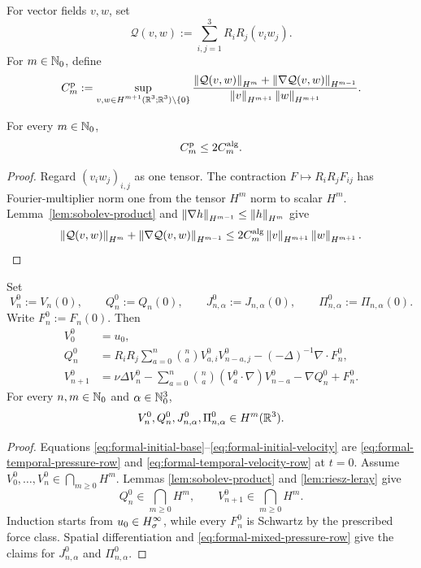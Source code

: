 \begin{definition}
\label{def:formal-canonical-bilinear-constants}
For vector fields \(v,w\), set
\[
 \mathcal Q(v,w):=\sum_{i,j=1}^3R_iR_j(v_i w_j).
\]
For \(m\in\mathbb N_0\), define
\[
 C_m^{\rm p}:=
 \sup_{\substack{
 v,w\in H^{m+1}(\mathbb R^3;\mathbb R^3)\setminus\{0\}}}
 \frac{
 \left\lVert \mathcal Q(v,w)\right\rVert_{H^m}
 +\left\lVert \nabla\mathcal Q(v,w)\right\rVert_{H^{m-1}}}
 {\left\lVert v\right\rVert_{H^{m+1}}\left\lVert w\right\rVert_{H^{m+1}}}.
\]
\end{definition}

\begin{lemma}
\label{lem:formal-canonical-bilinear-constants}
For every \(m\in\mathbb N_0\),
\[
 C_m^{\rm p}\le2C_m^{\rm alg}.
\]
\end{lemma}
\begin{proof}
Regard \((v_i w_j)_{i,j}\) as one tensor.  The contraction
\(F\mapsto R_iR_jF_{ij}\) has Fourier-multiplier norm one from the tensor
\(H^m\) norm to scalar \(H^m\).  Lemma~\ref{lem:sobolev-product} and
\(\left\lVert \nabla h\right\rVert_{H^{m-1}}\le\left\lVert h\right\rVert_{H^m}\) give
\[
 \left\lVert \mathcal Q(v,w)\right\rVert_{H^m}
 +\left\lVert \nabla\mathcal Q(v,w)\right\rVert_{H^{m-1}}
 \le2C_m^{\rm alg}\left\lVert v\right\rVert_{H^{m+1}}\left\lVert w\right\rVert_{H^{m+1}}.
\]
\end{proof}

\begin{lemma}
\label{lem:formal-initial-jet}
Set
\[
 V_n^0:=V_n(0),
 \qquad
 Q_n^0:=Q_n(0),
 \qquad
 J_{n,\alpha}^0:=J_{n,\alpha}(0),
 \qquad
 \Pi_{n,\alpha}^0:=\Pi_{n,\alpha}(0).
\]
Write \(F_n^0:=F_n(0)\).
Then
\begin{align}
 V_0^0&=u_0,
 \label{eq:formal-initial-base}\\
 Q_n^0
 &=R_iR_j
 \sum_{a=0}^{n}\binom naV_{a,i}^0V_{n-a,j}^0
 -(-\Delta)^{-1}\nabla\cdot F_n^0,
 \label{eq:formal-initial-pressure}\\
 V_{n+1}^0
 &=
 \nu\Delta V_n^0
 -\sum_{a=0}^{n}\binom na
 (V_a^0\cdot\nabla)V_{n-a}^0
 -\nabla Q_n^0+F_n^0.
 \label{eq:formal-initial-velocity}
\end{align}
For every \(n,m\in\mathbb N_0\) and \(\alpha\in\mathbb N_0^3\),
\[
 V_n^0,Q_n^0,J_{n,\alpha}^0,\Pi_{n,\alpha}^0\in H^m(\mathbb R^3).
\]
\par
\end{lemma}

\begin{proof}
Equations \eqref{eq:formal-initial-base}--\eqref{eq:formal-initial-velocity}
are \eqref{eq:formal-temporal-pressure-row} and
\eqref{eq:formal-temporal-velocity-row} at \(t=0\).  Assume
\(V_0^0,\ldots,V_n^0\in\bigcap_{m\ge0}H^m\).  Lemmas
\ref{lem:sobolev-product} and \ref{lem:riesz-leray} give
\[
 Q_n^0\in\bigcap_{m\ge0}H^m,
 \qquad
 V_{n+1}^0\in\bigcap_{m\ge0}H^m.
\]
Induction starts from \(u_0\in H^\infty_\sigma\), while every \(F_n^0\) is
Schwartz by the prescribed force class.  Spatial differentiation and
\eqref{eq:formal-mixed-pressure-row} give the claims for
\(J_{n,\alpha}^0\) and \(\Pi_{n,\alpha}^0\).
\end{proof}

